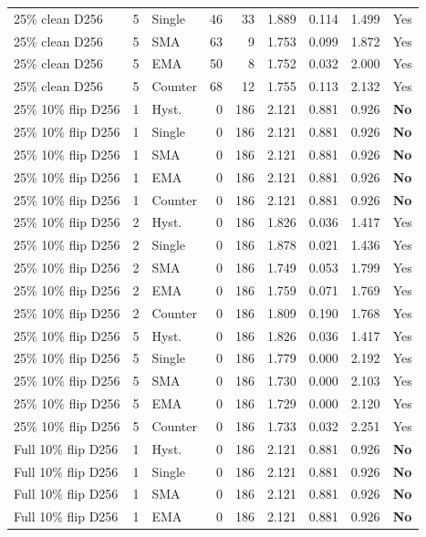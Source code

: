{\begin{longtable}{lllrrrrrl}
25\% clean D256 & 5 & Single & 46 & 33 & 1.889 & 0.114 & 1.499 & Yes\\
25\% clean D256 & 5 & SMA & 63 & 9 & 1.753 & 0.099 & 1.872 & Yes\\
25\% clean D256 & 5 & EMA & 50 & 8 & 1.752 & 0.032 & 2.000 & Yes\\
25\% clean D256 & 5 & Counter & 68 & 12 & 1.755 & 0.113 & 2.132 & Yes\\
25\% 10\% flip D256 & 1 & Hyst. & 0 & 186 & 2.121 & 0.881 & 0.926 & \textbf{No}\\
25\% 10\% flip D256 & 1 & Single & 0 & 186 & 2.121 & 0.881 & 0.926 & \textbf{No}\\
25\% 10\% flip D256 & 1 & SMA & 0 & 186 & 2.121 & 0.881 & 0.926 & \textbf{No}\\
25\% 10\% flip D256 & 1 & EMA & 0 & 186 & 2.121 & 0.881 & 0.926 & \textbf{No}\\
25\% 10\% flip D256 & 1 & Counter & 0 & 186 & 2.121 & 0.881 & 0.926 & \textbf{No}\\
25\% 10\% flip D256 & 2 & Hyst. & 0 & 186 & 1.826 & 0.036 & 1.417 & Yes\\
25\% 10\% flip D256 & 2 & Single & 0 & 186 & 1.878 & 0.021 & 1.436 & Yes\\
25\% 10\% flip D256 & 2 & SMA & 0 & 186 & 1.749 & 0.053 & 1.799 & Yes\\
25\% 10\% flip D256 & 2 & EMA & 0 & 186 & 1.759 & 0.071 & 1.769 & Yes\\
25\% 10\% flip D256 & 2 & Counter & 0 & 186 & 1.809 & 0.190 & 1.768 & Yes\\
25\% 10\% flip D256 & 5 & Hyst. & 0 & 186 & 1.826 & 0.036 & 1.417 & Yes\\
25\% 10\% flip D256 & 5 & Single & 0 & 186 & 1.779 & 0.000 & 2.192 & Yes\\
25\% 10\% flip D256 & 5 & SMA & 0 & 186 & 1.730 & 0.000 & 2.103 & Yes\\
25\% 10\% flip D256 & 5 & EMA & 0 & 186 & 1.729 & 0.000 & 2.120 & Yes\\
25\% 10\% flip D256 & 5 & Counter & 0 & 186 & 1.733 & 0.032 & 2.251 & Yes\\
Full 10\% flip D256 & 1 & Hyst. & 0 & 186 & 2.121 & 0.881 & 0.926 & \textbf{No}\\
Full 10\% flip D256 & 1 & Single & 0 & 186 & 2.121 & 0.881 & 0.926 & \textbf{No}\\
Full 10\% flip D256 & 1 & SMA & 0 & 186 & 2.121 & 0.881 & 0.926 & \textbf{No}\\
Full 10\% flip D256 & 1 & EMA & 0 & 186 & 2.121 & 0.881 & 0.926 & \textbf{No}\\

\end{longtable}}
